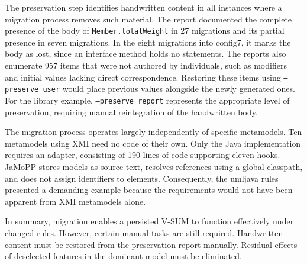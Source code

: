 The preservation step identifies handwritten content in all instances where a migration process removes such material.
The report documented the complete presence of the body of \texttt{Member.totalWeight} in 27 migrations and its partial presence in seven migrations.
In the eight migrations into config7, it marks the body as lost, since an interface method holds no statements.
The reports also enumerate 957 items that were not authored by individuals, such as modifiers and initial values lacking direct correspondence.
Restoring these items using \texttt{--preserve user} would place previous values alongside the newly generated ones.
For the library example, \texttt{--preserve report} represents the appropriate level of preservation, requiring manual reintegration of the handwritten body.

The migration process operates largely independently of specific metamodels.
Ten metamodels using XMI need no code of their own.
Only the Java implementation requires an adapter, consisting of 190 lines of code supporting eleven hooks.
JaMoPP stores models as source text, resolves references using a global classpath, and does not assign identifiers to elements.
Consequently, the umljava rules presented a demanding example because the requirements would not have been apparent from XMI metamodels alone.

In summary, migration enables a persisted V-SUM to function effectively under changed rules.
However, certain manual tasks are still required.
Handwritten content must be restored from the preservation report manually.
Residual effects of deselected features in the dominant model must be eliminated.
